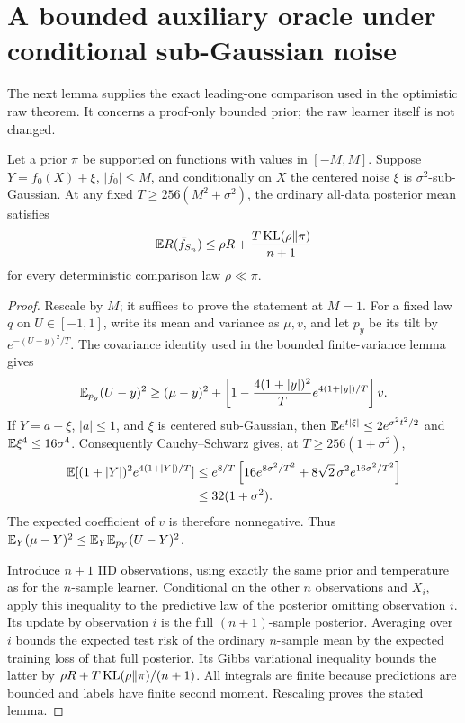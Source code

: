 \section{A bounded auxiliary oracle under conditional sub-Gaussian noise}
\label{sec:bounded-noise-oracle}
The next lemma supplies the exact leading-one comparison used in the
optimistic raw theorem. It concerns a proof-only bounded prior; the raw
learner itself is not changed.

\begin{lemma}
\label{lem:bounded-noise-oracle}
Let a prior $\pi$ be supported on functions with values in $[-M,M]$.
Suppose $Y=f_0(X)+\xi$, $|f_0|\le M$, and conditionally on $X$ the
centered noise $\xi$ is $\sigma^2$-sub-Gaussian. At any fixed
$T\ge256(M^2+\sigma^2)$, the ordinary all-data posterior mean satisfies
\[
 \mathbb E R(\bar f_{S_n})\le\rho R+\frac{T\operatorname{KL}(\rho\|\pi)}{n+1}
\]
for every deterministic comparison law $\rho\ll\pi$.
\end{lemma}
\begin{proof}
Rescale by $M$; it suffices to prove the statement at $M=1$.
For a fixed law $q$ on $U\in[-1,1]$, write its mean and variance as
$\mu,v$, and let $p_y$ be its tilt by $e^{-(U-y)^2/T}$.
The covariance identity used in the bounded finite-variance lemma gives
\[
 \mathbb E_{p_y}(U-y)^2\ge(\mu-y)^2+
 \left[1-\frac{4(1+|y|)^2}{T}e^{4(1+|y|)/T}\right]v.
\]
If $Y=a+\xi$, $|a|\le1$, and $\xi$ is centered sub-Gaussian, then
$\mathbb E e^{t|\xi|}\le2e^{\sigma^2t^2/2}$ and
$\mathbb E\xi^4\le16\sigma^4$. Consequently Cauchy--Schwarz gives, at
$T\ge256(1+\sigma^2)$,
\begin{align*}
 \mathbb E[(1+|Y|)^2e^{4(1+|Y|)/T}]
 &\le e^{8/T}\left[16e^{8\sigma^2/T^2}
             +8\sqrt2\,\sigma^2e^{16\sigma^2/T^2}\right]\\
 &\le32(1+\sigma^2).
\end{align*}
The expected coefficient of $v$ is therefore nonnegative. Thus
$\mathbb E_Y(\mu-Y)^2\le\mathbb E_Y\mathbb E_{p_Y}(U-Y)^2$.

Introduce $n+1$ IID observations, using exactly the same prior and
 temperature as for the $n$-sample learner. Conditional on the other
$n$ observations and $X_i$, apply this inequality to the predictive law
of the posterior omitting observation $i$. Its update by observation
$i$ is the full $(n+1)$-sample posterior. Averaging over $i$ bounds the
expected test risk of the ordinary $n$-sample mean by the expected
training loss of that full posterior. Its Gibbs variational inequality
bounds the latter by $\rho R+T\operatorname{KL}(\rho\|\pi)/(n+1)$.
All integrals are finite because predictions are bounded and labels
have finite second moment. Rescaling proves the stated lemma.
\end{proof}
